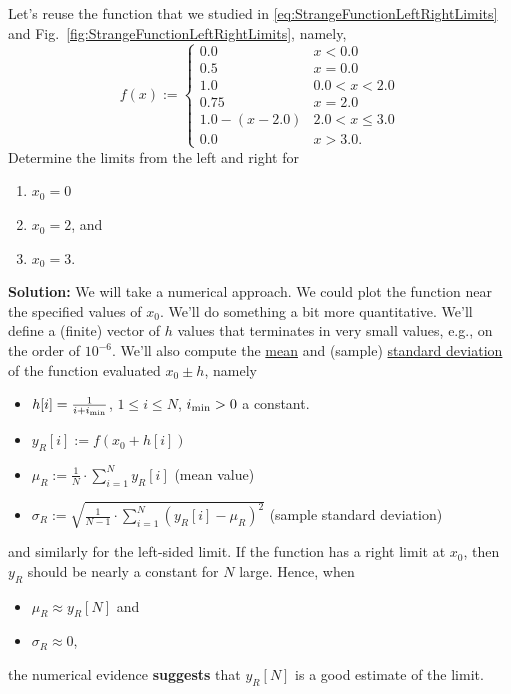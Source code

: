 \bigskip

\begin{example} Let's reuse the function that we studied in \eqref{eq:StrangeFunctionLeftRightLimits} and Fig.~\ref{fig:StrangeFunctionLeftRightLimits}, namely,
$$
    f(x) :=  \begin{cases}
        0.0 & x < 0.0 \\
        0.5 & x = 0.0 \\
        1.0 & 0.0 < x < 2.0 \\
        0.75 & x = 2.0 \\
        1.0 - (x-2.0) & 2.0 < x \le 3.0 \\
        0.0 & x > 3.0.
    \end{cases}
$$
Determine the limits from the left and right for 
\begin{enumerate}
\renewcommand{\labelenumi}{(\alph{enumi})}
\setlength{\itemsep}{.2cm}
    \item $x_0=0$

\item $x_0=2$, and

\item $x_0=3$.
\end{enumerate}    
\end{example}

\textbf{Solution:} We will take a numerical approach. We could plot the function near the specified values of $x_0$. We'll do something a bit more quantitative. We'll define a (finite) vector of $h$ values that terminates in very small values, e.g., on the order of $10^{-6}$. We'll also compute the \href{https://en.wikipedia.org/wiki/Mean}{mean} and (sample) \href{https://en.wikipedia.org/wiki/Standard_deviation}{standard deviation} of the function evaluated $x_0 \pm h$, namely
\begin{itemize}
    \item $h[i]=\frac{1}{i+i_{\rm min}}$, $1 \le i \le N$, $i_{\rm min}>0$ a constant.
    \item $y_R[i]:=f(x_0 + h[i])$
    \item $\mu_R := \frac{1}{N} \cdot \sum_{i=1}^N  y_R[i]$ (mean value)
    \item $\sigma_R :=  \sqrt{\frac{1}{N-1} \cdot \sum_{i=1}^N  \left( y_R[i]  - \mu_R \right)^2}$ (sample standard deviation)
\end{itemize}
and similarly for the left-sided limit. If the function has a right limit at $x_0$, then $y_R$ should be nearly a constant for $N$ large. Hence, when
\begin{itemize}
    \item $\mu_R \approx y_R[N]$ and
    \item  $\sigma_R \approx 0$,
\end{itemize}
the numerical evidence \textbf{suggests} that $y_R[N]$ is a good estimate of the limit.

